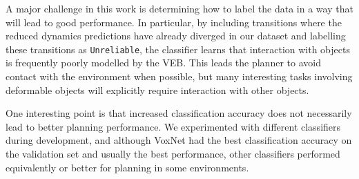 A major challenge in this work is determining how to label the data in a way that will lead to good performance. In particular, by including transitions where the reduced dynamics predictions have already diverged in our dataset and labelling these transitions as \texttt{Unreliable}, the classifier learns that interaction with objects is frequently poorly modelled by the VEB. This leads the planner to avoid contact with the environment when possible, but many interesting tasks involving deformable objects will explicitly require interaction with other objects.

One interesting point is that increased classification accuracy does not necessarily lead to better planning performance. We experimented with different classifiers during development, and although VoxNet had the best classification accuracy on the validation set and usually the best performance, other classifiers performed equivalently or better for planning in some environments. %




